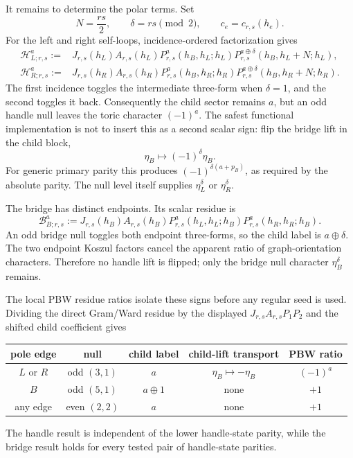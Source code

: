 \documentclass[11pt]{article}
\newcommand{\Hcal}{\mathcal H}
\newcommand{\Bcal}{\mathcal B}
\begin{document}
It remains to determine the polar terms.  Set
\begin{equation}
 N=\frac{rs}{2},\qquad \delta=rs\pmod2,
 \qquad c_e=c_{r,s}(h_e).
\end{equation}
For the left and right self-loops, incidence-ordered factorization gives
\begin{align}
 \Hcal_{L;r,s}^{a}
 :={}&J_{r,s}(h_L)A_{r,s}(h_L)
 P_{r,s}^{a}(h_B,h_L;h_L)
 P_{r,s}^{a\oplus\delta}(h_B,h_L+N;h_L),
 \label{eq:glasses-left-handle-residue}\\
 \Hcal_{R;r,s}^{a}
 :={}&J_{r,s}(h_R)A_{r,s}(h_R)
 P_{r,s}^{a}(h_B,h_R;h_R)
 P_{r,s}^{a\oplus\delta}(h_B,h_R+N;h_R).
 \label{eq:glasses-right-handle-residue}
\end{align}
The first incidence toggles the intermediate three-form when \(\delta=1\),
and the second toggles it back.  Consequently the child sector remains \(a\),
but an odd handle null leaves the toric character
\((-1)^a\).  The safest functional implementation is not to insert this as a
second scalar sign: flip the bridge lift in the child block,
\begin{equation}
 \eta_B\longmapsto(-1)^\delta\eta_B.
 \label{eq:glasses-handle-lift-transport}
\end{equation}
For generic primary parity this produces
\((-1)^{\delta(a+p_B)}\), as required by the absolute parity.  The null level
itself supplies \(\eta_L^\delta\) or \(\eta_R^\delta\).

The bridge has distinct endpoints.  Its scalar residue is
\begin{equation}
 \Bcal_{B;r,s}^{a}
 :=J_{r,s}(h_B)A_{r,s}(h_B)
 P_{r,s}^{a}(h_L,h_L;h_B)
 P_{r,s}^{a}(h_R,h_R;h_B).
 \label{eq:glasses-bridge-residue}
\end{equation}
An odd bridge null toggles both endpoint three-forms, so the child label is
\(a\oplus\delta\).  The two endpoint Koszul factors cancel the apparent
ratio of graph-orientation characters.  Therefore no handle lift is flipped;
only the bridge null character \(\eta_B^\delta\) remains.

The local PBW residue ratios isolate these signs before any regular seed is
used.  Dividing the direct Gram/Ward residue by the displayed
\(J_{r,s}A_{r,s}P_1P_2\) and the shifted child coefficient gives
\begin{center}
\begin{tabular}{c c c c c}
\toprule
pole edge & null & child label & child-lift transport & PBW ratio \\
\midrule
\(L\) or \(R\) & odd \((3,1)\) & \(a\) &
  \(\eta_B\mapsto-\eta_B\) & \((-1)^a\) \\
\(B\) & odd \((5,1)\) & \(a\oplus1\) & none & \(+1\) \\
any edge & even \((2,2)\) & \(a\) & none & \(+1\) \\
\bottomrule
\end{tabular}
\end{center}
The handle result is independent of the lower handle-state parity, while the
bridge result holds for every tested pair of handle-state parities.
\end{document}
